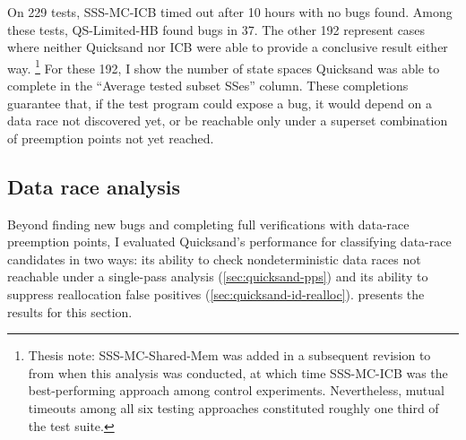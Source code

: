 On 229 tests, SSS-MC-ICB timed out after 10 hours with no bugs found. %
Among these tests, QS-Limited-HB %
found bugs in 37.
The other 192 represent cases where neither Quicksand nor ICB were able to provide a conclusive result either way.
\footnote{Thesis note: SSS-MC-Shared-Mem was added in a subsequent revision to \cite{quicksand}
from when this analysis was conducted, at which time SSS-MC-ICB was the best-performing approach among control experiments.
Nevertheless, mutual timeouts among all six testing approaches constituted roughly one third of the test suite.}
For these 192,
I show the number of state spaces Quicksand was able to complete in the
``Average tested subset SSes'' column.
These completions guarantee that, if the test program could expose a bug,
it would depend on a data race not discovered yet,
or be reachable only under a superset combination of preemption points not yet reached.


\subsection{Data race analysis}
\label{sec:quicksand-eval-nondets}

Beyond finding new bugs and completing full verifications with data-race preemption points,
I evaluated Quicksand's performance for classifying data-race candidates in two ways:
its ability to check nondeterministic data races not reachable under a single-pass analysis (\cref{sec:quicksand-pps})
and its ability to suppress reallocation false positives (\cref{sec:quicksand-id-realloc}).
 presents the results for this section.

